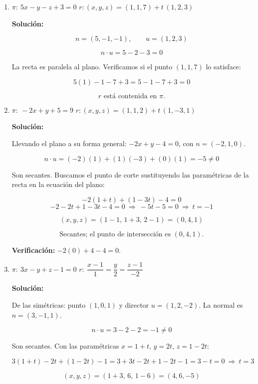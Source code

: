 \documentclass[12pt]{article}
\newcommand{\solucion}{%
    \vspace{0.8em}%
    \textbf{Solución:}%
    \vspace{0.8em}%
}
\begin{document}
\begin{enumerate}[label=\alph*.-]

    \item $\pi:\ 5x-y-z+3=0$ \qquad $r:(x,y,z)=(1,1,7)+t\,(1,2,3)$

    \solucion

    \[
    n=(5,-1,-1),\qquad u=(1,2,3)
    \]

    \[
    n\cdot u=5-2-3=0
    \]

    La recta es paralela al plano. Verificamos si el punto $(1,1,7)$ lo
    satisface:

    \[
    5(1)-1-7+3=5-1-7+3=0
    \]

    \[
    \boxed{r \text{ está contenida en } \pi.}
    \]

    \item $\pi:\ -2x+y+5=9$ \qquad $r:(x,y,z)=(1,1,2)+t\,(1,-3,1)$

    \solucion

    Llevando el plano a su forma general: $-2x+y-4=0$, con $n=(-2,1,0)$.

    \[
    n\cdot u=(-2)(1)+(1)(-3)+(0)(1)=-5\neq0
    \]

    Son secantes. Buscamos el punto de corte sustituyendo las paramétricas
    de la recta en la ecuación del plano:

    \[
    -2(1+t)+(1-3t)-4=0
    \]
    \[
    -2-2t+1-3t-4=0\ \Longrightarrow\ -5t-5=0\ \Longrightarrow\ t=-1
    \]

    \[
    (x,y,z)=(1-1,\,1+3,\,2-1)=(0,4,1)
    \]

    \[
    \boxed{\text{Secantes; el punto de intersección es } (0,4,1).}
    \]

    \textbf{Verificación:} $-2(0)+4-4=0$. \checkmark

    \item $\pi:\ 3x-y+z-1=0$ \qquad
    $r:\ \dfrac{x-1}{1}=\dfrac{y}{2}=\dfrac{z-1}{-2}$

    \solucion

    De las simétricas: punto $(1,0,1)$ y director $u=(1,2,-2)$. La normal es
    $n=(3,-1,1)$.

    \[
    n\cdot u=3-2-2=-1\neq0
    \]

    Son secantes. Con las paramétricas $x=1+t$, $y=2t$, $z=1-2t$:

    \[
    3(1+t)-2t+(1-2t)-1=3+3t-2t+1-2t-1=3-t=0
    \ \Longrightarrow\ t=3
    \]

    \[
    (x,y,z)=(1+3,\,6,\,1-6)=(4,6,-5)
    \]


\end{enumerate}
\end{document}
